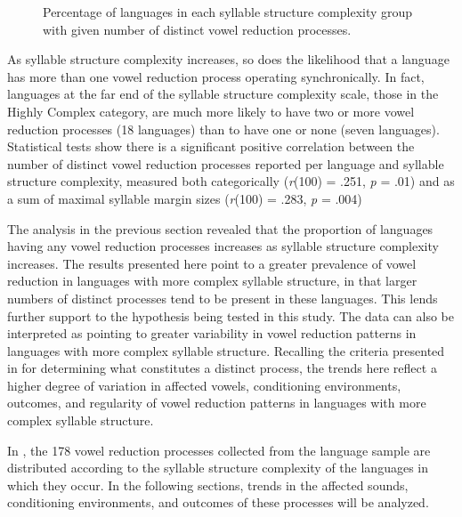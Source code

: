   
\begin{figure}
\caption{\label{fig:6.1} Percentage of languages in each syllable structure complexity group with given number of distinct vowel reduction processes.}
\end{figure}

  As syllable structure complexity increases, so does the likelihood that a language has more than one vowel reduction process operating synchronically. In fact, languages at the far end of the syllable structure complexity scale, those in the Highly Complex category, are much more likely to have two or more vowel reduction processes (18 languages) than to have one or none (seven languages). Statistical tests show there is a significant positive correlation between the number of distinct vowel reduction processes reported per language and syllable structure complexity, measured both categorically (\textit{r}(100) = .251, \textit{p} = .01) and as a sum of maximal syllable margin sizes (\textit{r}(100) = .283, \textit{p} = .004)

  The analysis in the previous section revealed that the proportion of languages having any vowel reduction processes increases as syllable structure complexity increases. The results presented here point to a greater prevalence of vowel reduction in languages with more complex syllable structure, in that larger numbers of distinct processes tend to be present in these languages. This lends further support to the hypothesis being tested in this study. The data can also be interpreted as pointing to greater variability in vowel reduction patterns in languages with more complex syllable structure. Recalling the criteria presented in  for determining what constitutes a distinct process, the trends here reflect a higher degree of variation in affected vowels, conditioning environments, outcomes, and regularity of vowel reduction patterns in languages with more complex syllable structure.

  In , the 178 vowel reduction processes collected from the language sample are distributed according to the syllable structure complexity of the languages in which they occur. In the following sections, trends in the affected sounds, conditioning environments, and outcomes of these processes will be analyzed.

